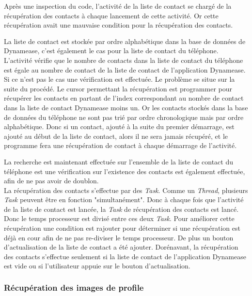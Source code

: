 Après une inspection du code, l'activité de la liste de contact se chargé de la récupération des contacts à chaque lancement de cette activité. Or cette récupération avait une mauvaise condition pour la récupération des contacts.

La liste de contact est stockée par ordre alphabétique dans la base de données de Dynamease, c'est également le cas pour la liste de contact du téléphone. L'activité vérifie que le nombre de contacts dans la liste de contact du téléphone est égale au nombre de contact de la liste de contact de l'application Dynamease. Si ce n'est pas le cas une vérification est effectuée. Le problème se situe sur la suite du procédé. Le cursor permettant la récupération est programmer pour récupérer les contacts en partant de l'index correspondant au nombre de contact dans la liste de contact Dynamease moins un. Or les contacts stockés dans la base de données du téléphone ne sont pas trié par ordre chronologique mais par ordre alphabétique. Donc si un contact, ajouté à la suite du premier démarrage, est ajouté au début de la liste de contact, alors il ne sera jamais récupéré, et le programme fera une récupération de contact à chaque démarrage de l'activité.

La recherche est maintenant effectuée sur l'ensemble de la liste de contact du téléphone est une vérification sur l'existence des contacts est également effectuée, afin de ne pas avoir de doublon.\\ 

La récupération des contacts s'effectue par des \textit{Task}. Comme un \textit{Thread}, plusieurs \textit{Task} peuvent être en fonction "simultanément". Donc à chaque fois que l'activité de la liste de contact est lancée, la \textit{Task} de récupération des contacts est lancé. Donc le temps processeur est divisé entre ces deux \textit{Task}. Pour améliorer cette récupération une condition est rajouter pour déterminer si une récupération est déjà en cour afin de ne pas re-diviser le temps processeur. De plus un bouton d'actualisation de la liste de contact a été ajouter. Dorénavant, la récupération des contacts s'effectue seulement si la liste de contact de l'application Dynamease est vide ou si l'utilisateur appuie sur le bouton d'actualisation.

\subsubsection{Récupération des images de profile}

